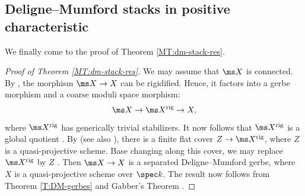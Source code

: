 \documentclass[reqno,a4paper]{amsart}
\numberwithin{Theorem}{section}
\theoremstyle{plain}
\theoremstyle{remark}
\begin{document}
\subsection{Deligne--Mumford stacks in positive characteristic}
We finally come to the proof of Theorem \ref{MT:dm-stack-res}.
\begin{proof}[Proof of Theorem \ref{MT:dm-stack-res}]
  We may assume that $\ms X$ is connected. By \cite[Prop. 2.1]{olssonboundedness}, the morphism $\ms X \to X$
  can be rigidified. Hence, it factors into a gerbe morphism and a
  coarse moduli space morphism:
  \[
    \ms X \to \ms X^{\text{rig}} \to X,
  \]
  where $\ms X^{\mathrm{rig}}$ has generically trivial stabilizers.
  It now follows that $\ms X^{\mathrm{rig}}$ is a global quotient
  \cite[Thm. 2.18]{MR1844577}. By \cite[Thm.\ 2.1]{MR2026412} (see also \cite[Cor.~4.5]{zbMATH07471377}), there
  is a finite flat cover $Z \to \ms X^{\mathrm{rig}}$, where $Z$ is a
  quasi-projective scheme. Base changing along this cover, we may
  replace $\ms X^{\mathrm{rig}}$ by $Z$
  \cite[Prop. 5.3(vii)]{2013arXiv1306.5418G}. Then $\ms X \to X$ is a
  separated Deligne--Mumford gerbe, where $X$ is a quasi-projective
  scheme over $\spec k$. The result now follows from Theorem
  \ref{T:DM-gerbes} and Gabber's Theorem
  \cite{deJong_result-of-Gabber}.
\end{proof}
\end{document}
